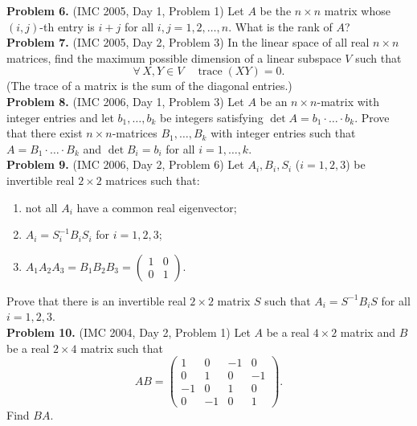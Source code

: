 \documentclass{article}
\begin{document}
\textbf{Problem 6.} (IMC 2005, Day 1, Problem 1)
Let \( A \) be the \( n \times n \) matrix whose \( (i,j) \)-th entry is \( i + j \) for all \( i, j = 1, 2, \ldots, n \).
What is the rank of \( A \)?
\\

\textbf{Problem 7.} (IMC 2005, Day 2, Problem 3)
In the linear space of all real \( n \times n \) matrices, find the maximum possible dimension
of a linear subspace \( V \) such that
\[
\forall\, X, Y \in V \quad \operatorname{trace}(XY) = 0.
\]
(The trace of a matrix is the sum of the diagonal entries.)
\\

\textbf{Problem 8.} (IMC 2006, Day 1, Problem 3)
Let \( A \) be an \( n \times n \)-matrix with integer entries and let \( b_1, \ldots, b_k \) be integers satisfying \( \det A = b_1 \cdot \ldots \cdot b_k \). Prove that there exist \( n \times n \)-matrices \( B_1, \ldots, B_k \) with integer entries such that \( A = B_1 \cdot \ldots \cdot B_k \) and \( \det B_i = b_i \) for all \( i = 1, \ldots, k \).
\\

\textbf{Problem 9.} (IMC 2006, Day 2, Problem 6)
Let \( A_i, B_i, S_i \) (\( i = 1, 2, 3 \)) be invertible real \( 2 \times 2 \) matrices such that:
\begin{enumerate}
    \item not all \( A_i \) have a common real eigenvector;
    \item \( A_i = S_i^{-1} B_i S_i \) for \( i = 1, 2, 3 \);
    \item \( A_1 A_2 A_3 = B_1 B_2 B_3 = \begin{pmatrix} 1 & 0 \\ 0 & 1 \end{pmatrix} \).
\end{enumerate}
Prove that there is an invertible real \( 2 \times 2 \) matrix \( S \) such that \( A_i = S^{-1} B_i S \) for all \( i = 1, 2, 3 \).
\\

\textbf{Problem 10.} (IMC 2004, Day 2, Problem 1)
Let \( A \) be a real \( 4 \times 2 \) matrix and \( B \) be a real \( 2 \times 4 \) matrix such that
\[
AB = \begin{pmatrix} 1 & 0 & -1 & 0 \\ 0 & 1 & 0 & -1 \\ -1 & 0 & 1 & 0 \\ 0 & -1 & 0 & 1 \end{pmatrix}.
\]
Find \( BA \).
\\
\end{document}
